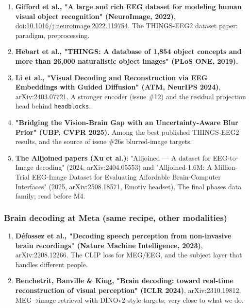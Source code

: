\documentclass[
  11pt,
]{article}
\providecommand{\tightlist}{%
  \setlength{\itemsep}{0pt}\setlength{\parskip}{0pt}}
\renewcommand{\_}{\oldunderscore\allowbreak}
\begin{document}
\begin{enumerate}
\def\labelenumi{\arabic{enumi}.}
\setcounter{enumi}{3}
\tightlist
\item
  \textbf{Gifford et al., "A large and
  rich EEG dataset for modeling human
  visual object recognition"
  (NeuroImage, 2022)},
  \url{doi:10.1016/j.neuroimage.2022.119754}.
  The THINGS-EEG2 dataset paper:
  paradigm, preprocessing.
\item
  \textbf{Hebart et al., "THINGS: A
  database of 1,854 object concepts and
  more than 26,000 naturalistic object
  images" (PLoS ONE, 2019).}
\item
  \textbf{Li et al., "Visual Decoding
  and Reconstruction via EEG Embeddings
  with Guided Diffusion" (ATM, NeurIPS
  2024)}, arXiv:2403.07721. A stronger
  encoder (issue \#12) and the residual
  projection head behind
  \texttt{head\_blocks}.
\item
  \textbf{"Bridging the Vision-Brain Gap
  with an Uncertainty-Aware Blur Prior"
  (UBP, CVPR 2025).} Among the best
  published THINGS-EEG2 results, and the
  source of issue \#26\textquotesingle s
  blurred-image targets.
\item
  \textbf{The Alljoined papers (Xu et
  al.)}: "Alljoined --- A dataset for
  EEG-to-Image decoding" (2024,
  arXiv:2404.05553) and "Alljoined-1.6M:
  A Million-Trial EEG-Image Dataset for
  Evaluating Affordable Brain-Computer
  Interfaces" (2025, arXiv:2508.18571,
  Emotiv headset). The final
  phase\textquotesingle s data family;
  read before M4.
\end{enumerate}

\subsubsection{Brain decoding at Meta
(same recipe, other
modalities)}\label{brain-decoding-at-meta-same-recipe-other-modalities}

\begin{enumerate}
\def\labelenumi{\arabic{enumi}.}
\setcounter{enumi}{8}
\tightlist
\item
  \textbf{Défossez et al., "Decoding
  speech perception from non-invasive
  brain recordings" (Nature Machine
  Intelligence, 2023)},
  arXiv:2208.12266. The CLIP loss for
  MEG/EEG, and the subject layer that
  handles different people.
\item
  \textbf{Benchetrit, Banville \& King,
  "Brain decoding: toward real-time
  reconstruction of visual perception"
  (ICLR 2024)}, arXiv:2310.19812.
  MEG→image retrieval with DINOv2-style
  targets; very close to what we do.
\end{enumerate}
\end{document}
